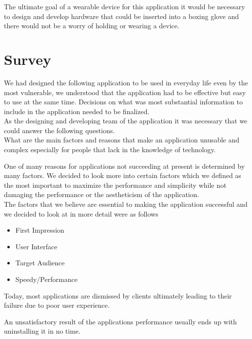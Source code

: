 \documentclass[a4paper,12pt,twoside]{report}
\begin{document}
The ultimate goal of a wearable device for this application it would be necessary to design and develop hardware that could be inserted into a boxing glove and there would not be a worry of holding or wearing a device.

\section{Survey}
\vspace{5mm} %

We had designed the following application to be used in everyday life even by the most vulnerable, we understood that the application had to be effective but easy to use at the same time. Decisions on what was most substantial information to include in the application needed to be finalized.\\

As the designing and developing team of the application it was necessary that we could answer the following questions. \\

What are the main factors and reasons that make an application unusable and complex especially for people that lack in the knowledge of technology.

One of many reasons for applications not succeeding at present is determined by many factors. We decided to look more into certain factors which we defined as the most important to maximize the performance and simplicity while not damaging the performance or the aestheticism of the application. 
\cite{DesignFailure}\\

The factors that we believe are essential to making the application successful and we decided to look at in more detail were as follows

\begin{itemize}
    \item First Impression
    \item User Interface
    \item Target Audience
    \item Speedy/Performance
\end{itemize}

Today, most applications are dismissed by clients ultimately leading to their failure due to poor user experience.

An unsatisfactory result of the applications performance usually ends up with uninstalling it in no time. 
\cite{AppFailure}
\end{document}
